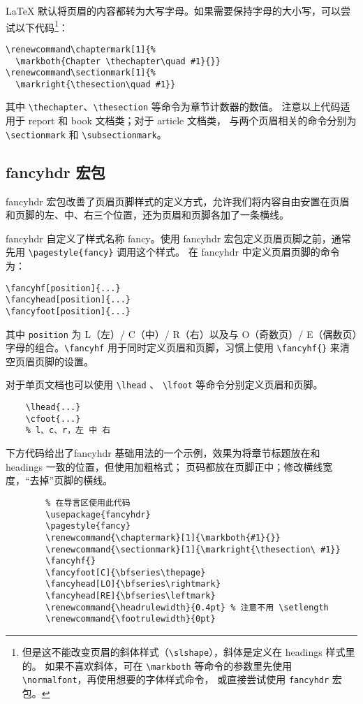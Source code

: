 \LaTeX{} 默认将页眉的内容都转为大写字母。如果需要保持字母的大小写，可以尝试以下代码\footnote{但是这不能改变页眉的斜体样式（\lstinline{\slshape}），斜体是定义在 {headings} 样式里的。
如果不喜欢斜体，可在 \lstinline{\markboth} 等命令的参数里先使用 \lstinline{\normalfont}，再使用想要的字体样式命令，
或直接尝试使用 \lstinline{fancyhdr} 宏包。}：
\begin{lstlisting}
\renewcommand\chaptermark[1]{%
  \markboth{Chapter \thechapter\quad #1}{}}
\renewcommand\sectionmark[1]{%
  \markright{\thesection\quad #1}}
\end{lstlisting}

其中 \lstinline{\thechapter}、\lstinline{\thesection} 等命令为章节计数器的数值。
注意以上代码适用于 {report} 和 {book} 文档类；对于 {article} 文档类，
与两个页眉相关的命令分别为 \lstinline{\sectionmark} 和 \lstinline{\subsectionmark}。

\subsection{{fancyhdr} 宏包}\label{subsec:fancyhdr}

{fancyhdr} 宏包改善了页眉页脚样式的定义方式，允许我们将内容自由安置在页眉和页脚的左、中、右三个位置，还为页眉和页脚各加了一条横线。

{fancyhdr} 自定义了样式名称 {fancy}。使用 {fancyhdr} 宏包定义页眉页脚之前，通常先用 \lstinline|\pagestyle{fancy}| 调用这个样式。
在 {fancyhdr} 中定义页眉页脚的命令为：
\begin{lstlisting}
\fancyhf[position]{...}
\fancyhead[position]{...}
\fancyfoot[position]{...}
\end{lstlisting}
其中 \lstinline{position} 为 L（左）/ C（中）/ R（右）以及与 O（奇数页）/ E（偶数页）字母的组合。\lstinline{\fancyhf} 用于同时定义页眉和页脚，习惯上使用 \lstinline|\fancyhf{}| 来清空页眉页脚的设置。

对于单页文档也可以使用 \lstinline{\lhead} 、 \lstinline{\lfoot} 等命令分别定义页眉和页脚。

\begin{lstlisting}
    \lhead{...}
    \cfoot{...}
    % l、c、r，左 中 右
\end{lstlisting}

下方代码给出了{fancyhdr} 基础用法的一个示例，效果为将章节标题放在和 headings 一致的位置，但使用加粗格式；
页码都放在页脚正中；修改横线宽度，“去掉”页脚的横线。

\begin{lstlisting}
        % 在导言区使用此代码
        \usepackage{fancyhdr}
        \pagestyle{fancy}
        \renewcommand{\chaptermark}[1]{\markboth{#1}{}}
        \renewcommand{\sectionmark}[1]{\markright{\thesection\ #1}}
        \fancyhf{}
        \fancyfoot[C]{\bfseries\thepage}
        \fancyhead[LO]{\bfseries\rightmark}
        \fancyhead[RE]{\bfseries\leftmark}
        \renewcommand{\headrulewidth}{0.4pt} % 注意不用 \setlength
        \renewcommand{\footrulewidth}{0pt}
\end{lstlisting}

